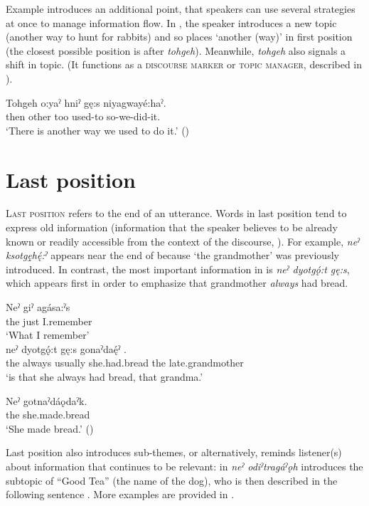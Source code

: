 Example  introduces an additional point, that speakers can use several strategies at once to manage information flow. In , the speaker introduces a new topic (another way to hunt for rabbits) and so places  ‘another (way)’ in first position (the closest possible position is after \textit{tohgeh}). Meanwhile, \textit{tohgeh} also signals a shift in topic. (It functions as a \textsc{discourse marker} or \textsc{topic manager}, described in ).

\ea\label{ex:flexwordex7}
\gll Tohgeh o:yaˀ hniˀ gę:s niyagwayé:haˀ.\\
then other too used-to so-we-did-it.\\
\glt ‘There is another way we used to do it.’ (\cite{mithun_how_1980})
\z


\section{Last position} \label{ch:Last position}
\textsc{Last position} refers to the end of an utterance. Words in last position tend to express old information (information that the speaker believes to be already known or readily accessible from the context of the discourse, \cite[405]{mithun_morphological_1995}). For example, \textit{neˀ ksotgę̱hę́:ˀ} appears near the end of  because ‘the grandmother’ was previously introduced. In contrast, the most important information in  is \textit{neˀ dyotgǫ́:t gę:s}, which appears first in order to emphasize that grandmother \emph{always} had bread. 

\ea\label{ex:flexwordex8}
\ea\label{ex:flexwordex8a} 
\gll Neˀ giˀ agása:ˀs \\
the just I.remember \\
\glt ‘What I remember’\\

\ex \label{ex:flexwordex8b}
\gll neˀ dyotgǫ́:t gę:s gonaˀdaę́ˀ  .\\
the always usually she.had.bread the late.grandmother \\
\glt ‘is that she always had bread, that grandma.’

\ex \label{ex:flexwordex8c}
\gll Neˀ gotnaˀdáǫdaˀk.\\
the she.made.bread\\
\glt ‘She made bread.’ (\cite{henry_de_2005})
\z
\z

Last position also introduces sub-themes, or alternatively, reminds listener(s) about information that continues to be relevant: in  \textit{neˀ odiˀtragáˀǫh} introduces the subtopic of “Good Tea” (the name of the dog), who is then described in the following sentence . More examples are provided in .

